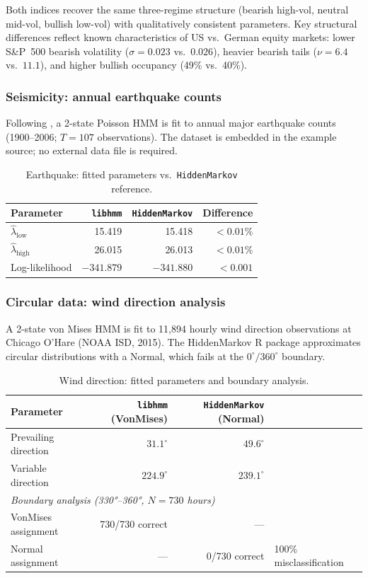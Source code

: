 \documentclass[11pt]{article}
\begin{document}
Both indices recover the same three-regime structure (bearish high-vol,
neutral mid-vol, bullish low-vol) with qualitatively consistent parameters.
Key structural differences reflect known characteristics of US vs.\ German
equity markets: lower S\&P~500 bearish volatility ($\sigma = 0.023$ vs.\
$0.026$), heavier bearish tails ($\nu = 6.4$ vs.\ $11.1$), and higher
bullish occupancy (49\% vs.\ 40\%).

\subsubsection{Seismicity: annual earthquake counts}
\label{sec:earthquake}

Following \citet{Zucchini2009}, a 2-state Poisson HMM is fit to
annual major earthquake counts (1900--2006; $T = 107$ observations).
The dataset is embedded in the example source; no external data file is
required.

\begin{table}[!ht]
\centering
\caption{Earthquake: fitted parameters vs.\ \texttt{HiddenMarkov} reference.}
\label{tab:earthquake}
\begin{tabular}{lrrr}
\toprule
Parameter & \texttt{libhmm} & \texttt{HiddenMarkov} & Difference \\
\midrule
$\hat{\lambda}_\text{low}$  & 15.419 & 15.418 & $<0.01\%$ \\
$\hat{\lambda}_\text{high}$ & 26.015 & 26.013 & $<0.01\%$ \\
Log-likelihood              & $-341.879$ & $-341.880$ & $<0.001$ \\
\bottomrule
\end{tabular}
\end{table}

\subsubsection{Circular data: wind direction analysis}
\label{sec:wind}

A 2-state von Mises HMM is fit to 11,894 hourly wind direction observations
at Chicago O'Hare (NOAA ISD, 2015).
The HiddenMarkov R package approximates circular distributions with a
Normal, which fails at the $0^\circ/360^\circ$ boundary.

\begin{table}[!ht]
\centering
\caption{Wind direction: fitted parameters and boundary analysis.}
\label{tab:wind}
\begin{tabular}{lrrl}
\toprule
Parameter & \texttt{libhmm} (VonMises) & \texttt{HiddenMarkov} (Normal) & \\
\midrule
Prevailing direction & $31.1^\circ$ & $49.6^\circ$ & \\
Variable direction   & $224.9^\circ$ & $239.1^\circ$ & \\
\midrule
\multicolumn{4}{l}{\textit{Boundary analysis (330°--360°, $N=730$ hours)}} \\
VonMises assignment & 730/730 correct & --- & \\
Normal assignment   & ---  & 0/730 correct & 100\% misclassification \\
\bottomrule
\end{tabular}
\end{table}
\end{document}
